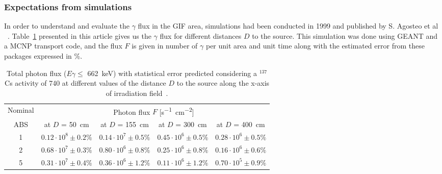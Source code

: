 		\subsubsection{Expectations from simulations}
		\label{sssec:Simulations}
		
			In order to understand and evaluate the $\gamma$ flux in the GIF area, simulations had been conducted in 1999 and published by S. Agosteo et al ~\cite{AGOSTEO1999}. Table~\ref{tab:Sim1997} presented in this article gives us the $\gamma$ flux for different distances $D$ to the source. This simulation was done using GEANT and a \acf{MCNP} transport code, and the flux $F$ is given in number of $\gamma$ per unit area and unit time along with the estimated error from these packages expressed in \%.
			
			\begin{table}[!h]
				\hspace*{-1.1cm}
				\begin{tabular}{|*{5}{c|}}
					\hline
					Nominal & \multicolumn{4}{c|}{Photon flux $F$ [\si{\second^{-1}\cm^{-2}}]} \\
					\cline{2-5}
					ABS & at $D$ = \SI{50}{\cm} & at $D$ = \SI{155}{\cm} & at $D$ = \SI{300}{\cm} & at $D$ = \SI{400}{\cm} \\
					\hline
					1 & $0.12 \cdot 10^8 \pm 0.2\%$ & $0.14 \cdot 10^7 \pm 0.5\%$ & $0.45 \cdot 10^6 \pm 0.5\%$ & $0.28 \cdot 10^6 \pm 0.5\%$ \\
					\hline
					2 & $0.68 \cdot 10^7 \pm 0.3\%$ & $0.80 \cdot 10^6 \pm 0.8\%$ & $0.25 \cdot 10^6 \pm 0.8\%$ & $0.16 \cdot 10^6 \pm 0.6\%$ \\
					\hline
					5 & $0.31 \cdot 10^7 \pm 0.4\%$ & $0.36 \cdot 10^6 \pm 1.2\%$ & $0.11 \cdot 10^6 \pm 1.2\%$ & $0.70 \cdot 10^5 \pm 0.9\%$ \\
					\hline
				\end{tabular}
				\caption{\label{tab:Sim1997} Total photon flux ($E\gamma \leq$ \SI{662}{\keV}) with statistical error predicted considering a $^{137}$Cs activity of \SI{740}{\GBq} at different values of the distance $D$ to the source along the x-axis of irradiation field~\cite{AGOSTEO1999}.}
			\end{table}
			
